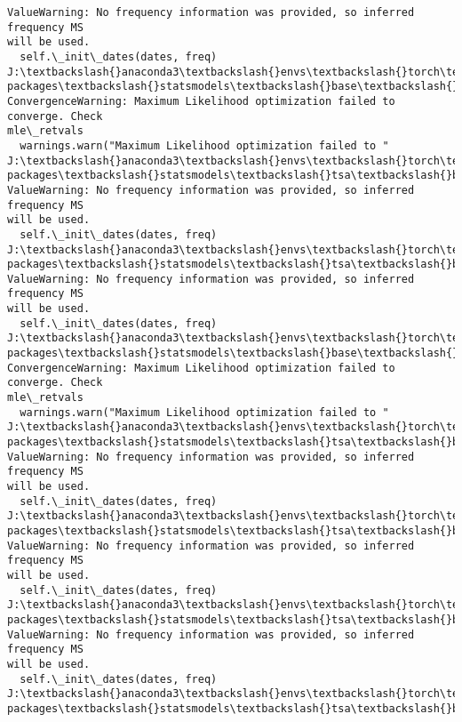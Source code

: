 \documentclass[11pt]{article}
\begin{document}
\begin{Verbatim}[commandchars=\\\{\}]
ValueWarning: No frequency information was provided, so inferred frequency MS
will be used.
  self.\_init\_dates(dates, freq)
J:\textbackslash{}anaconda3\textbackslash{}envs\textbackslash{}torch\textbackslash{}Lib\textbackslash{}site-packages\textbackslash{}statsmodels\textbackslash{}base\textbackslash{}model.py:607:
ConvergenceWarning: Maximum Likelihood optimization failed to converge. Check
mle\_retvals
  warnings.warn("Maximum Likelihood optimization failed to "
J:\textbackslash{}anaconda3\textbackslash{}envs\textbackslash{}torch\textbackslash{}Lib\textbackslash{}site-packages\textbackslash{}statsmodels\textbackslash{}tsa\textbackslash{}base\textbackslash{}tsa\_model.py:473:
ValueWarning: No frequency information was provided, so inferred frequency MS
will be used.
  self.\_init\_dates(dates, freq)
J:\textbackslash{}anaconda3\textbackslash{}envs\textbackslash{}torch\textbackslash{}Lib\textbackslash{}site-packages\textbackslash{}statsmodels\textbackslash{}tsa\textbackslash{}base\textbackslash{}tsa\_model.py:473:
ValueWarning: No frequency information was provided, so inferred frequency MS
will be used.
  self.\_init\_dates(dates, freq)
J:\textbackslash{}anaconda3\textbackslash{}envs\textbackslash{}torch\textbackslash{}Lib\textbackslash{}site-packages\textbackslash{}statsmodels\textbackslash{}base\textbackslash{}model.py:607:
ConvergenceWarning: Maximum Likelihood optimization failed to converge. Check
mle\_retvals
  warnings.warn("Maximum Likelihood optimization failed to "
J:\textbackslash{}anaconda3\textbackslash{}envs\textbackslash{}torch\textbackslash{}Lib\textbackslash{}site-packages\textbackslash{}statsmodels\textbackslash{}tsa\textbackslash{}base\textbackslash{}tsa\_model.py:473:
ValueWarning: No frequency information was provided, so inferred frequency MS
will be used.
  self.\_init\_dates(dates, freq)
J:\textbackslash{}anaconda3\textbackslash{}envs\textbackslash{}torch\textbackslash{}Lib\textbackslash{}site-packages\textbackslash{}statsmodels\textbackslash{}tsa\textbackslash{}base\textbackslash{}tsa\_model.py:473:
ValueWarning: No frequency information was provided, so inferred frequency MS
will be used.
  self.\_init\_dates(dates, freq)
J:\textbackslash{}anaconda3\textbackslash{}envs\textbackslash{}torch\textbackslash{}Lib\textbackslash{}site-packages\textbackslash{}statsmodels\textbackslash{}tsa\textbackslash{}base\textbackslash{}tsa\_model.py:473:
ValueWarning: No frequency information was provided, so inferred frequency MS
will be used.
  self.\_init\_dates(dates, freq)
J:\textbackslash{}anaconda3\textbackslash{}envs\textbackslash{}torch\textbackslash{}Lib\textbackslash{}site-packages\textbackslash{}statsmodels\textbackslash{}tsa\textbackslash{}base\textbackslash{}tsa\_model.py:473:

\end{Verbatim}
\end{document}
